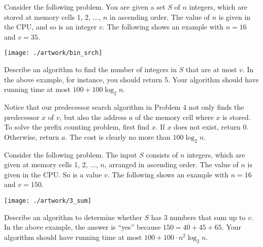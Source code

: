  Consider the following problem. You are given a set $S$ of $n$ integers, which are stored at memory cells 1, 2, ..., $n$ in ascending order. The value of $n$ is given in the CPU, and so is an integer $v$. The following shows an example with $n = 16$ and $v = 35$. 

\begin{center} 
    \texttt{[image: ./artwork/bin\_srch]}
\end{center}

\noindent Describe an algorithm to find the number of integers in $S$ that are at most $v$. In the above example, for instance, you should return 5. Your algorithm should have running time at most $100 + 100 \log_2 n$. 

\begin{sol} 
 Notice that our predecessor search algorithm in Problem 4 not only finds the predecessor $x$ of $v$, but also the address $a$ of the memory cell where $x$ is stored. To solve the prefix counting problem, first find $x$. If $x$ does not exist, return 0. Otherwise, return $a$. The cost is clearly no more than $100 \log_2 n$.  
\end{sol}

 Consider the following problem. The input $S$ consists of $n$ integers, which are given at memory cells 1, 2, ..., $n$, arranged in ascending order. The value of $n$ is given in the CPU. So is a value $v$. The following shows an example with $n = 16$ and $v = 150$.

\begin{center} 
    \texttt{[image: ./artwork/3\_sum]}
\end{center}

\noindent Describe an algorithm to determine whether $S$ has 3 numbers that sum up to $v$. In the above example, the answer is ``yes'' because $150 = 40 + 45 + 65$. Your algorithm should have running time at most $100 + 100 \cdot n^2 \log_2 n$.

